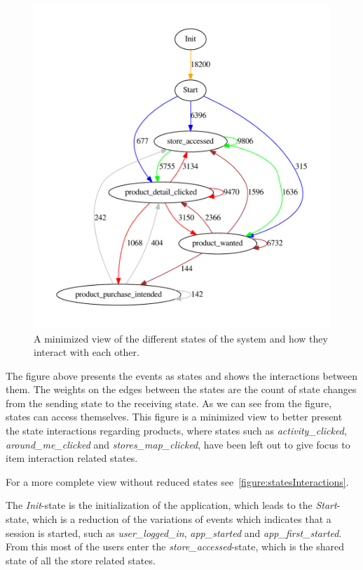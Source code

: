 \begin{figure}[H]
  \centering
  \includegraphics[width=5in]{image/statesInteractionTrue-gvfile.pdf}
  \caption{A minimized view of the different states of the system and how they interact with each other.}
  \label{figure:minStatesInteractions}
\end{figure}

The figure above presents the events as states and shows the interactions
between them.  The weights on the edges between the states are the count of
state changes from the sending state to the receiving state.  As we can see
from the figure, states can access themselves.  This figure is a minimized view
to better present the state interactions regarding products, where states such
as \emph{activity\_clicked}, \emph{around\_me\_clicked} and
\emph{stores\_map\_clicked}, have been left out to give focus to item
interaction related states.

For a more complete view without reduced states see~\ref{figure:statesInteractions}.

The \emph{Init}-state is the initialization of the application, which leads to
the \emph{Start}-state, which is a reduction of the variations of events which
indicates that a session is started, such as \emph{user\_logged\_in},
\emph{app\_started} and \emph{app\_first\_started}.  From this most of the
users enter the \emph{store\_accessed}-state, which is the shared state of all
the store related states.

